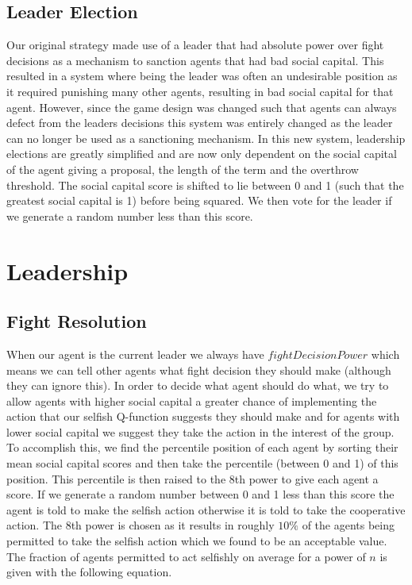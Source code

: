 \subsection{Leader Election}

Our original strategy made use of a leader that had absolute power over fight decisions as a mechanism to sanction agents that had bad social capital. This resulted in a system where being the leader was often an undesirable position as it required punishing many other agents, resulting in bad social capital for that agent. However, since the game design was changed such that agents can always defect from the leaders decisions this system was entirely changed as the leader can no longer be used as a sanctioning mechanism. In this new system, leadership elections are greatly simplified and are now only dependent on the social capital of the agent giving a proposal, the length of the term and the overthrow threshold. The social capital score is shifted to lie between 0 and 1 (such that the greatest social capital is 1) before being squared. We then vote for the leader if we generate a random number less than this score.

\section {Leadership}

\subsection{Fight Resolution}

When our agent is the current leader we always have $fightDecisionPower$ which means we can tell other agents what fight decision they should make (although they can ignore this). In order to decide what agent should do what, we try to allow agents with higher social capital a greater chance of implementing the action that our selfish Q-function suggests they should make and for agents with lower social capital we suggest they take the action in the interest of the group. To accomplish this, we find the percentile position of each agent by sorting their mean social capital scores and then take the percentile (between 0 and 1) of this position. This percentile is then raised to the 8th power to give each agent a score. If we generate a random number between 0 and 1 less than this score the agent is told to make the selfish action otherwise it is told to take the cooperative action. The 8th power is chosen as it results in roughly $10\%$ of the agents being permitted to take the selfish action which we found to be an acceptable value. The fraction of agents permitted to act selfishly on average for a power of $n$ is given with the following equation.

